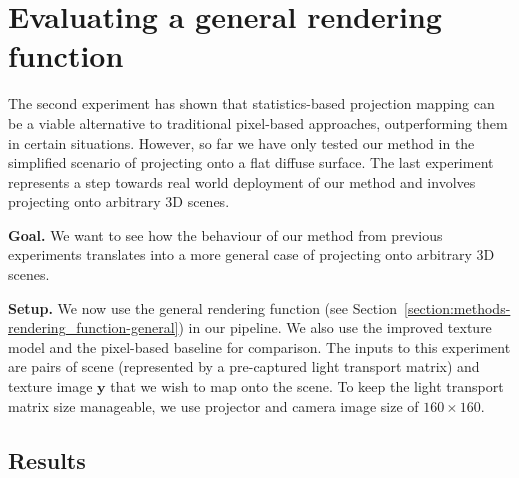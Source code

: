 \section{Evaluating a general rendering function}
\label{section:results-experiments-03}

The second experiment has shown that statistics-based projection mapping can be a viable alternative to traditional pixel-based approaches, outperforming them in certain situations. However, so far we have only tested our method in the simplified scenario of projecting onto a flat diffuse surface. The last experiment represents a step towards real world deployment of our method and involves projecting onto arbitrary 3D scenes.

\textbf{Goal.} We want to see how the behaviour of our method from previous experiments translates into a more general case of projecting onto arbitrary 3D scenes.

\textbf{Setup.} We now use the general rendering function (see Section~\ref{section:methods-rendering_function-general}) in our pipeline. We also use the improved texture model and the pixel-based baseline for comparison. The inputs to this experiment are pairs of scene (represented by a pre-captured light transport matrix) and texture image \(\bm{y}\) that we wish to map onto the scene. To keep the light transport matrix size manageable, we use projector and camera image size of \(160 \times 160\).

\subsection{Results}
\label{section:results-experiments-03-results}

